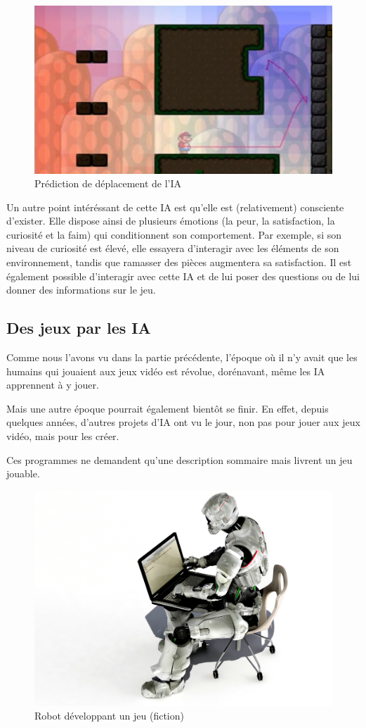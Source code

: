 \documentclass[a4paper, 12pt]{article} %
\begin{document}
\begin{figure}[!h]%
	\begin{center} 
		\includegraphics[width=0.60\columnwidth]{images/mario.jpg}%
		\caption{Prédiction de déplacement de l'IA}%
	\end{center}
\end{figure}

Un autre point intéréssant de cette IA est qu'elle est (relativement) consciente d'exister. Elle dispose ainsi de plusieurs émotions (la peur, la satisfaction, la curiosité et la faim) qui conditionnent son comportement. Par exemple, si son niveau de curiosité est élevé, elle essayera d'interagir avec les éléments de son environnement, tandis que ramasser des pièces augmentera sa satisfaction. Il est également possible d'interagir avec cette IA et de lui poser des questions ou de lui donner des informations sur le jeu. 

\newpage
\subsection{Des jeux par les IA}

Comme nous l'avons vu dans la partie précédente, l'époque où il n'y avait que les humains qui jouaient aux jeux vidéo est révolue, dorénavant, même les IA apprennent à y jouer.

Mais une autre époque pourrait également bientôt se finir. En effet, depuis quelques années, d'autres projets d'IA ont vu le jour, non pas pour jouer aux jeux vidéo, mais pour les créer. 

Ces programmes ne demandent qu'une description sommaire mais livrent un jeu jouable.

\begin{figure}[!h]%
	\begin{center} 
		\includegraphics[width=0.60\columnwidth]{images/robotdeveloping.jpg}%
		\caption{Robot développant un jeu (fiction)}%
	\end{center}
\end{figure}
\end{document}
